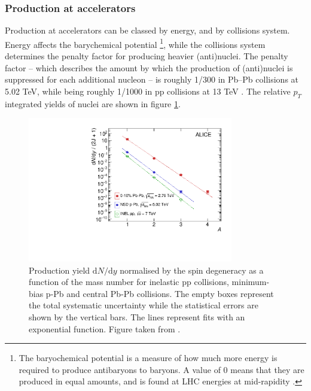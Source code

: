 \subsubsection{Production at accelerators}
Production at accelerators can be classed by energy, and by collisions system. Energy affects the barychemical potential \footnote{The baryochemical potential is a measure of how much more energy is required to produce antibaryons to baryons. A value of 0 means that they are produced in equal amounts, and is found at LHC energies at mid-rapidity \cite{primordial_ratio1, primordial_ratio2}.}, while the collisions system determines the penalty factor for producing heavier (anti)nuclei. The penalty factor -- which describes the amount by which the production of (anti)nuclei is suppressed for each additional nucleon -- is roughly 1/300 in Pb--Pb collisions at 5.02 TeV, while being roughly 1/1000 in pp collisions at 13 TeV \cite{antinuclei_mult_dependence}. The relative $p_T$ integrated yields of nuclei are shown in figure \ref{fig:PenaltyFactorNuclei}. \\

\begin{figure}[h!]
    \centering
    \includegraphics[width=0.8\textwidth]{figures/PenaltyFactor-97548.pdf}
    \caption{Production yield $\mathrm{d}N/\mathrm{d}y$  normalised by the spin degeneracy as a function of the mass number for inelastic pp collisions, minimum-bias p-Pb and central Pb-Pb collisions. The empty boxes represent the total systematic uncertainty while the statistical errors are shown by the vertical bars. The lines represent fits with an exponential function. Figure taken from \cite{antinuclei_mult_dependence}.  }
    \label{fig:PenaltyFactorNuclei}
\end{figure}



